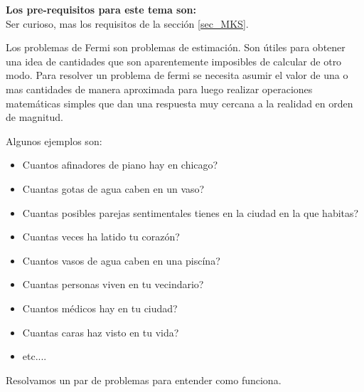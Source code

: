 \begin{prere}
\begin{tcolorbox}[colback=blue!5!white,colframe=blue!75!black,boxrule=0.5pt,arc=4pt, left=6pt,right=6pt,top=6pt,bottom=6pt,boxsep=0pt] 
  \textbf{Los pre-requisitos para este tema son:}\\
  Ser curioso, mas los requisitos de la secci\'on \ref{sec_MKS}.
\end{tcolorbox} 
\end{prere}
Los problemas de Fermi son problemas de estimaci\'on. Son \'utiles para obtener una idea de cantidades que son aparentemente imposibles de calcular de otro modo. Para resolver un problema de fermi se necesita asumir el valor de una o mas cantidades de manera aproximada para luego realizar operaciones matem\'aticas simples que dan una respuesta muy cercana a la realidad en orden de magnitud. 
\begin{example}
\begin{tcolorbox}[colback=green!5!white,colframe=green!75!black,boxrule=0.5pt,arc=4pt,left=6pt,right=6pt,top=6pt,bottom=6pt,boxsep=0pt]
Algunos ejemplos son:\\
\begin{itemize}
\item Cuantos afinadores de piano hay en chicago?
\item Cuantas gotas de agua caben en un vaso?
\item Cuantas posibles parejas sentimentales tienes en la ciudad en la que habitas?
\item Cuantas veces ha latido tu coraz\'on?
\item Cuantos vasos de agua caben en una pisc\'ina?
\item Cuantas personas viven en tu vecindario?
\item Cuantos m\'edicos hay en tu ciudad?
\item Cuantas caras haz visto en tu vida?
\item etc....
\end{itemize}
\end{tcolorbox}

\end{example}
Resolvamos un par de problemas para entender como funciona.\\
